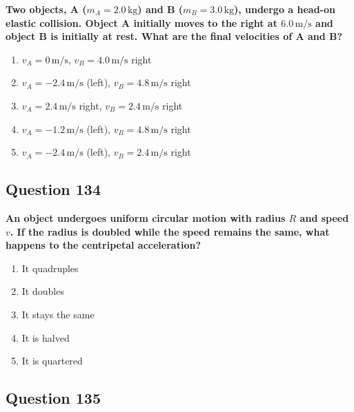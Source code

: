 \documentclass[12pt,letterpaper]{article}
\begin{document}
\begin{questionbox}
\textbf{Two objects, A ($m_A = 2.0\,\text{kg}$) and B ($m_B = 3.0\,\text{kg}$), undergo a head-on elastic collision. Object A initially moves to the right at $6.0\,\text{m/s}$ and object B is initially at rest. What are the final velocities of A and B?}

\begin{enumerate}[label=\alph*)]
    \item $v_A = 0\,\text{m/s}$, $v_B = 4.0\,\text{m/s}$ right
    \item $v_A = -2.4\,\text{m/s}$ (left), $v_B = 4.8\,\text{m/s}$ right
    \item $v_A = 2.4\,\text{m/s}$ right, $v_B = 2.4\,\text{m/s}$ right
    \item $v_A = -1.2\,\text{m/s}$ (left), $v_B = 4.8\,\text{m/s}$ right
    \item $v_A = -2.4\,\text{m/s}$ (left), $v_B = 2.4\,\text{m/s}$ right
\end{enumerate}
\end{questionbox}

\subsection{Question 134}

\begin{questionbox}
\textbf{An object undergoes uniform circular motion with radius $R$ and speed $v$. If the radius is doubled while the speed remains the same, what happens to the centripetal acceleration?}

\begin{enumerate}[label=\alph*)]
    \item It quadruples
    \item It doubles
    \item It stays the same
    \item It is halved
    \item It is quartered
\end{enumerate}
\end{questionbox}

\subsection{Question 135}
\end{document}

